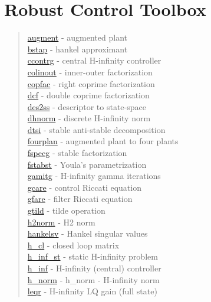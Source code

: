 \chapter*{Robust Control Toolbox}

\begin{quote}
\noindent
\hyperlink{augment}{augment} - {augmented plant} \\  
\hyperlink{bstap}{bstap} - {hankel approximant} \\  
\hyperlink{ccontrg}{ccontrg} - {central H-infinity controller} \\  
\hyperlink{colinout}{colinout} - {inner-outer factorization} \\  
\hyperlink{copfac}{copfac} - {right coprime factorization} \\  
\hyperlink{dcf}{dcf} - {double coprime factorization} \\  
\hyperlink{des2ss}{des2ss} - {descriptor to state-space} \\  
\hyperlink{dhnorm}{dhnorm} - {discrete H-infinity norm} \\  
\hyperlink{dtsi}{dtsi} - {stable anti-stable decomposition} \\  
\hyperlink{fourplan}{fourplan} - {augmented plant to four plants} \\  
\hyperlink{fspecg}{fspecg} - {stable factorization} \\  
\hyperlink{fstabst}{fstabst} - {Youla's parametrization} \\  
\hyperlink{gamitg}{gamitg} - {H-infinity gamma iterations} \\  
\hyperlink{gcare}{gcare} - {control Riccati equation} \\  
\hyperlink{gfare}{gfare} - {filter Riccati equation} \\  
\hyperlink{gtild}{gtild} - {tilde operation} \\  
\hyperlink{h2norm}{h2norm} - {H2 norm} \\  
\hyperlink{hankelsv}{hankelsv} - {Hankel singular values} \\  
\hyperlink{h_cl}{h\_cl}  - {closed loop matrix} \\  
\hyperlink{h_inf_st}{h\_inf\_st}  - {static H-infinity problem} \\  
\hyperlink{h_inf}{h\_inf}  - {H-infinity (central) controller} \\  
\hyperlink{h_norm}{h\_norm} - {h_norm} - {H-infinity norm} \\  
\hyperlink{leqr}{leqr} - {H-infinity LQ gain (full state)  } \\  

\end{quote}
